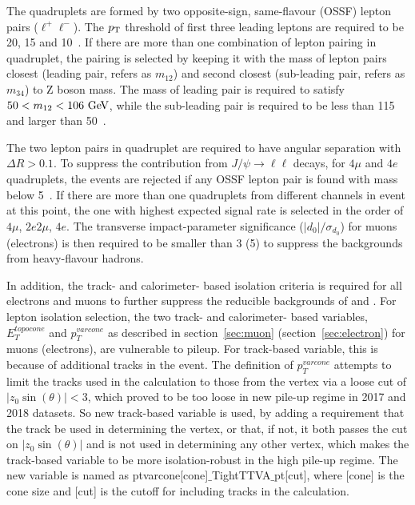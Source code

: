 The \llll quadruplets are formed by two opposite-sign, same-flavour (OSSF) lepton pairs ($\ell^{+}\ell^{-}$).
The $p_{\text{T}}$ threshold of first three leading leptons are required to be 20, 15 and 10~\gev.
If there are more than one combination of lepton pairing in quadruplet, the pairing is selected by keeping it with the mass of lepton pairs closest (leading pair, refers as $m_{12}$) and second closest (sub-leading pair, refers as $m_{34}$) to Z boson mass.
The mass of leading pair is required to satisfy $50 < m_{12} < 106~\text{Ge\kern -0.1em V}$, while the sub-leading pair is required to be less than 115~\gev~ and larger than 50~\gev. 

The two lepton pairs in quadruplet are required to have angular separation with $\Delta R > 0.1$.
To suppress the contribution from $J/\psi \rightarrow \ell\ell$ decays, for $4\mu$ and $4e$ quadruplets, the events are rejected if any OSSF lepton pair is found with mass below 5~\gev.
If there are more than one quadruplets from different channels in event at this point, the one with highest expected signal rate is selected in the order of $4\mu$, $2e2\mu$, $4e$.
The transverse impact-parameter significance ($|d_0|/\sigma_{d_0}$) for muons (electrons) is then required to be smaller than 3 (5) to suppress the backgrounds from heavy-flavour hadrons.

In addition, the track- and calorimeter- based isolation criteria is required for all electrons and muons to further suppress the reducible backgrounds of \Zjet and \ttbar.
For lepton isolation selection, the two track- and calorimeter- based variables, $E_{T}^{topocone}$ and $p_{T}^{varcone}$ as described in section~\ref{sec:muon} (section~\ref{sec:electron}) for muons (electrons), are vulnerable to pileup.
For track-based variable, this is because of additional tracks in the event.
The definition of $p_{T}^{varcone}$ attempts to limit the tracks used in the calculation to those from the vertex via a loose cut of $|z_0\sin(\theta)| < 3$,
which proved to be too loose in new pile-up regime in 2017 and 2018 datasets.
So new track-based variable is used, 
by adding a requirement that the track be used in determining the vertex, or that, if not, it both passes the cut on $|z_0\sin(\theta)|$ and is not used in determining any other vertex,
which makes the track-based variable to be more isolation-robust in the high pile-up regime.
The new variable is named as ptvarcone[cone]$\_$TightTTVA$\_$pt[\pt cut], where [cone] is the cone size and [\pt cut] is the cutoff for including tracks in the calculation.

